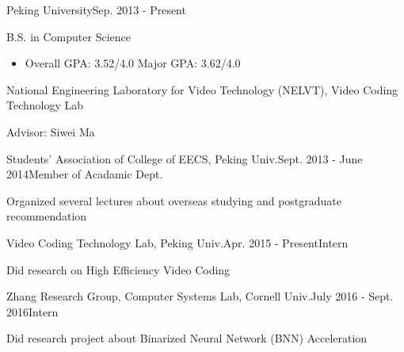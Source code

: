 \documentclass{joel_cv}
\begin{document}
\pagestyle{empty}

\begin{cvHeader} 
\end{cvHeader}

%
%

\begin{sectionContentSimple}{Peking University}{Sep. 2013 - Present}
	\item B.S. in Computer Science
	\begin{itemize}
		\item Overall GPA: 3.52/4.0 \quad Major GPA: 3.62/4.0
	\end{itemize}
	\item National Engineering Laboratory for Video Technology (NELVT), Video Coding Technology Lab
	\item Advisor: Siwei Ma
\end{sectionContentSimple}

%
%


\begin{sectionContentNormal}{Students' Association of College of EECS, Peking Univ.}{Sept. 2013 - June 2014}{Member of Acadamic Dept.}
	\item Organized several lectures about overseas studying and postgraduate recommendation
\end{sectionContentNormal}

\begin{sectionContentNormal}{Video Coding Technology Lab, Peking Univ.}{Apr. 2015 - Present}{Intern}
	\item Did research on High Efficiency Video Coding
\end{sectionContentNormal}

\begin{sectionContentNormal}{Zhang Research Group, Computer Systems Lab, Cornell Univ.}{July 2016 - Sept. 2016}{Intern}
	\item Did research project about Binarized Neural Network (BNN) Acceleration
\end{sectionContentNormal}


%
%
\end{document}
